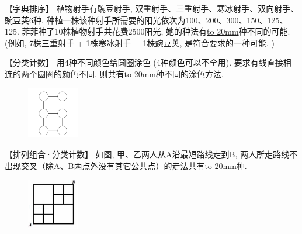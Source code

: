 \item {
    【字典排序】
    植物射手有豌豆射手, 双重射手、三重射手、寒冰射手、双向射手、豌豆荚6种. 种植一株该种射手所需要的阳光依次为100、200、300、150、125、125. 菲菲种了10株植物射手共花费2500阳光, 她的种法有\underline{\hbox to 20mm{}}种不同的可能.  (例如, 7株三重射手 + 1株寒冰射手 + 1株豌豆荚, 是符合要求的一种可能. )
    \vspace{1cm}
}

\item {
    【分类计数】
    用4种不同颜色给圆圈涂色 (4种颜色可以不全用). 要求有线直接相连的两个圆圈的颜色不同. 则共有\underline{\hbox to 20mm{}}种不同的涂色方法.
    \begin{figure}[H] 
        \centering
        \includegraphics[width=0.2\textwidth]{./pics/Chapter_4/2016_3.png}
    \end{figure}
}

\item {
    【排列组合·分类计数】
    如图, 甲、乙两人从A沿最短路线走到B, 两人所走路线不出现交叉（除A、B两点外没有其它公共点）的走法共有\underline{\hbox to 20mm{}}种. 
    \begin{figure}[H] 
        \centering
        \includegraphics[width=0.2\textwidth]{./pics/Chapter_4/2016_4.png}
    \end{figure}
}


